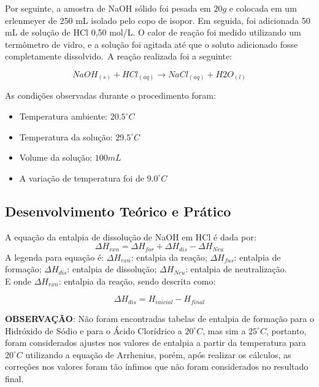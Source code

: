        \indent Por seguinte, a amostra de NaOH sólido foi pesada em $20g$ e colocada em um erlenmeyer de 250 mL isolado pelo copo de isopor. Em seguida, foi adicionada 50 mL de solução de HCl 0,50 mol/L. O calor de reação foi medido utilizando um termômetro de vidro, e a solução foi agitada até que o soluto adicionado fosse completamente dissolvido.\ A reação realizada foi a seguinte:\
        
        \begin{equation}
            NaOH_{(s)} + HCl_{(aq)} \rightarrow NaCl_{(aq)} + H2O_{(l)} \label{eq:equação principal NaOH sólido}
        \end{equation}
    	
    	\indent As condições observadas durante o procedimento foram:
    	\begin{itemize}
    		\item Temperatura ambiente: $20.5^{\circ}C$
    		\item Temperatura da solução: $29.5^{\circ}C$
    		\item Volume da solução: $100 mL$
    		\item A variação de temperatura foi de $9.0^{\circ}C$
    	\end{itemize}
                

        \subsection{Desenvolvimento Teórico e Prático}\label{sec:calculos}
            \indent A equação da entalpia de dissolução de NaOH em HCl é dada por:
            \begin{equation}
                \Delta H_{rxn} = \Delta H_{for} + \Delta H_{dis} - \Delta H_{Neu}\label{eq:equacao de entalpia geral}
            \end{equation}
			\indent A legenda para equação é: $\Delta H_{rxn}$: entalpia da reação; $\Delta H_{fus}$: entalpia de formação; $\Delta H_{dis}$: entalpia de dissolução; $\Delta H_{Neu}$: entalpia de neutralização.\\
			
			\indent E onde $\Delta H_{rxn}$: entalpia da reação, sendo descrita como:\
			
			\begin{equation}
				\Delta H_{dis} = H_{inicial} - H_{final}\label{eq:equation1}
            \end{equation}
        
			\indent \textbf{OBSERVAÇÃO}: Não foram encontradas tabelas de entalpia de formação para o Hidróxido de Sódio e para o Ácido Clorídrico a $20^{\circ}C$, mas sim a
            $25^{\circ}C$, portanto, foram considerados ajustes nos valores de entalpia a partir da temperatura para $20^{\circ}C$ utilizando a equação de Arrhenius, porém, após realizar os cálculos, as correções nos valores foram tão ínfimos que não foram considerados no resultado final.\\
            
